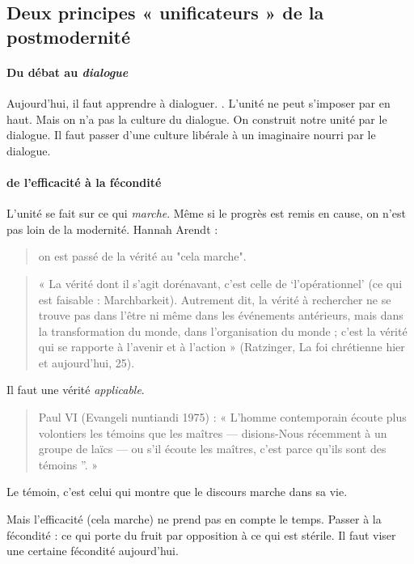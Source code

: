 \subsection{Deux principes « unificateurs » de la postmodernité}

\paragraph{Du débat au \textit{dialogue}} Aujourd'hui, il faut apprendre à dialoguer. . L'unité ne peut s'imposer par en haut. Mais on n'a pas la culture du dialogue. On construit notre unité par le dialogue. Il faut passer d'une culture libérale à un imaginaire nourri par le dialogue. 

\paragraph{de l'efficacité à la fécondité} L'unité se fait sur ce qui \textit{marche}. Même si le progrès est remis en cause, on n'est pas loin de la modernité. 
Hannah Arendt : 
\begin{quote}
    on est passé de la vérité au "cela marche".
\end{quote}
\begin{quote}
    « La vérité dont il s’agit dorénavant, c’est celle de ‘l’opérationnel’ (ce qui est faisable : Marchbarkeit). Autrement dit, la vérité à rechercher ne se trouve pas dans l’être ni même dans les événements antérieurs, mais dans la transformation du monde, dans l’organisation du monde ; c’est la vérité qui se rapporte à l’avenir et à l’action » (Ratzinger, La foi chrétienne
hier et aujourd’hui, 25).
\end{quote}
Il faut une vérité \textit{applicable}. 
\begin{quote}
    Paul VI (Evangeli nuntiandi 1975) : « L’homme contemporain écoute plus volontiers les
témoins que les maîtres — disions-Nous récemment à un groupe de laïcs — ou s’il écoute les
maîtres, c’est parce qu’ils sont des témoins ”. »
\end{quote}
Le témoin, c'est celui qui montre que le discours marche dans sa vie. 

Mais l'efficacité (cela marche) ne prend pas en compte le temps. Passer à la fécondité : ce qui porte du fruit par opposition à ce qui est stérile. Il faut viser une certaine fécondité aujourd'hui. 

